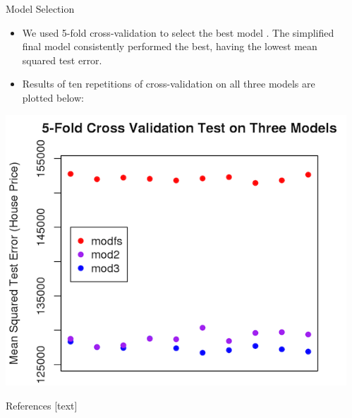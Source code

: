 \documentclass[final]{beamer}
\begin{document}
\begin{frame}[fragile]
\begin{columns}[t]
\begin{column}{0.31\linewidth}
\begin{minipage}[t][.955\textheight]{\linewidth}
\end{minipage}
\end{column}%

\begin{column}{0.31\linewidth}
\begin{minipage}[t][.955\textheight]{\linewidth} 
\begin{block}{Model Selection}
\begin{itemize}
\item We used 5-fold cross-validation to select the best model \cite{R-boot}. The simplified final model consistently performed the best, having the lowest mean squared test error.
\item Results of ten repetitions of cross-validation on all three models are plotted below:
\end{itemize}

\centering
\includegraphics{cvplot.png}
\vspace{0ex}
\end{block}
\vfill


\begin{block}{References}
\footnotesize
{}[text]
\vspace{-1ex}


\vfill
\end{block} 
\vfill

\end{minipage}
\end{column}%




\end{columns}
\end{frame}
\end{document}
